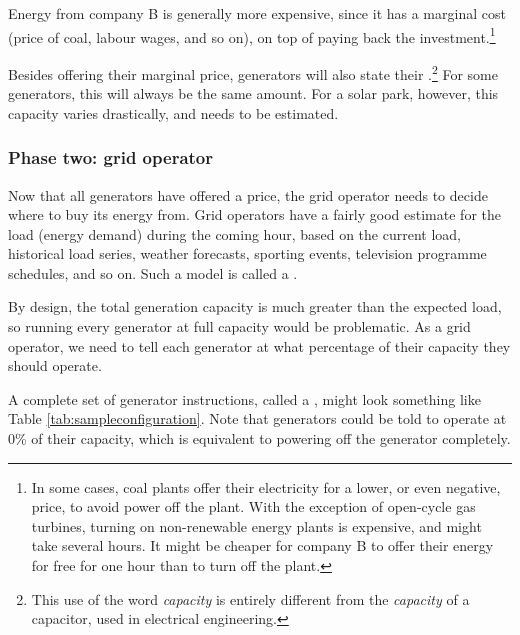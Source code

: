 \documentclass[main.tex]{subfiles}
\begin{document}
Energy from company B is generally more expensive, since it has a marginal cost (price of coal, labour wages, and so on), on top of paying back the investment.\footnote{In some cases, coal plants offer their electricity for a lower, or even negative, price, to avoid power off the plant. With the exception of open-cycle gas turbines, turning on non-renewable energy plants is expensive, and might take several hours. It might be cheaper for company B to offer their energy for free for one hour than to turn off the plant.}


Besides offering their marginal price, generators will also state their .\footnote{This use of the word \emph{capacity} is entirely different from the \emph{capacity} of a capacitor, used in electrical engineering.} For some generators, this will always be the same amount. For a solar park, however, this capacity varies drastically, and needs to be estimated.

\subsubsection*{Phase two: grid operator}
Now that all generators have offered a price, the grid operator needs to decide where to buy its energy from. Grid operators have a fairly good estimate for the load (energy demand) during the coming hour, based on the current load, historical load series, weather forecasts, sporting events, television programme schedules, and so on. Such a model is called a . 

By design, the total generation capacity is much greater than the expected load,  so running every generator at full capacity would be problematic.
As a grid operator, we need to tell each generator at what percentage of their capacity they should operate. 

A complete set of generator instructions, called a , might look something like Table \ref{tab:sampleconfiguration}. Note that generators could be told to operate at 0\% of their capacity, which is equivalent to powering off the generator completely.
\end{document}
